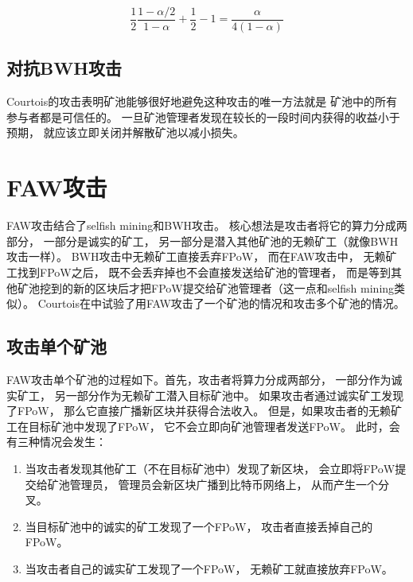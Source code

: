 \documentclass[a4paper, 11pt]{article}
\begin{document}
\begin{CJK*}{UTF8}{gbsn}
\begin{enumerate}
        \begin{equation}
            \frac{1}{2} \frac{1-\alpha/2}{1-\alpha} + \frac{1}{2} - 1 = \frac{\alpha}{4(1-\alpha)}
        \end{equation}

    \end{enumerate}

    \subsection{对抗BWH攻击}

    \indent

    Courtois的攻击表明矿池能够很好地避免这种攻击的唯一方法就是
    矿池中的所有参与者都是可信任的。
    一旦矿池管理者发现在较长的一段时间内获得的收益小于预期，
    就应该立即关闭并解散矿池以减小损失。


    \section{FAW攻击}

    \indent

    FAW攻击\cite{ref_FAW}结合了selfish mining和BWH攻击。
    核心想法是攻击者将它的算力分成两部分，
    一部分是诚实的矿工，
    另一部分是潜入其他矿池的无赖矿工（就像BWH攻击一样）。
    BWH攻击中无赖矿工直接丢弃FPoW，
    而在FAW攻击中，
    无赖矿工找到FPoW之后，
    既不会丢弃掉也不会直接发送给矿池的管理者，
    而是等到其他矿池挖到的新的区块后才把FPoW提交给矿池管理者（这一点和selfish mining类似）。
    Courtois在\cite{ref_FAW}中试验了用FAW攻击了一个矿池的情况和攻击多个矿池的情况。

    \subsection{攻击单个矿池}

    \indent

    FAW攻击单个矿池的过程如下。首先，攻击者将算力分成两部分，
    一部分作为诚实矿工，
    另一部分作为无赖矿工潜入目标矿池中。
    如果攻击者通过诚实矿工发现了FPoW，
    那么它直接广播新区块并获得合法收入。
    但是，如果攻击者的无赖矿工在目标矿池中发现了FPoW，
    它不会立即向矿池管理者发送FPoW。
    此时，会有三种情况会发生：

    \begin{enumerate}
        \item 当攻击者发现其他矿工（不在目标矿池中）发现了新区块，
        会立即将FPoW提交给矿池管理员，
        管理员会新区块广播到比特币网络上，
        从而产生一个分叉。
        \item 当目标矿池中的诚实的矿工发现了一个FPoW，
        攻击者直接丢掉自己的FPoW。
        \item 当攻击者自己的诚实矿工发现了一个FPoW，
        无赖矿工就直接放弃FPoW。
    \end{enumerate}


\end{CJK*}
\end{document}
